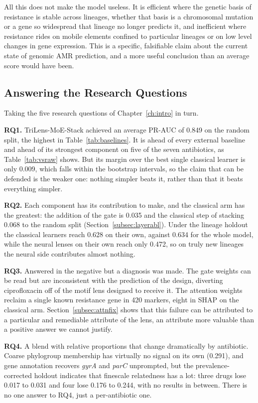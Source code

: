 All this does not make the model useless. It is efficient where the genetic basis of resistance
is stable across lineages, whether that basis is a chromosomal mutation or a gene so widespread
that lineage no longer predicts it, and inefficient where resistance rides on mobile elements
confined to particular lineages or on low level changes in gene expression. This is a specific,
falsifiable claim about the current state of genomic AMR prediction, and a more useful
conclusion than an average score would have been.

\subsection{Answering the Research Questions}

Taking the five research questions of Chapter~\ref{ch:intro} in turn.

\textbf{RQ1.} TriLens-MoE-Stack achieved an average PR-AUC of 0.849 on the random split, the
highest in Table~\ref{tab:baselines}. It is ahead of every external baseline and ahead of its
strongest component on five of the seven antibiotics, as Table~\ref{tab:vsraw} shows. But its
margin over the best single classical learner is only 0.009, which falls
within the bootstrap intervals, so the claim that can be defended is the weaker one: nothing
simpler beats it, rather than that it beats everything simpler.

\textbf{RQ2.} Each component has its contribution to make, and the classical arm has the greatest:
the addition of the gate is 0.035 and the classical step of stacking 0.068 to the random split
(Section~\ref{subsec:layerabl}). Under the lineage holdout the classical learners reach 0.628 on
their own, against 0.634 for the whole model, while the neural lenses on their own reach only
0.472, so on truly new lineages the neural side contributes almost nothing.

\textbf{RQ3.} Answered in the negative but a diagnosis was made. The gate weights can be read but
are inconsistent with the prediction of the design, diverting ciprofloxacin off of the motif lens
designed to receive it. The attention weights reclaim a single known resistance gene in 420
markers, eight in SHAP on the classical arm. Section~\ref{subsec:attnfix} shows that this failure
can be attributed to a particular and remediable attribute of the lens, an attribute more valuable
than a positive answer we cannot justify.

\textbf{RQ4.} A blend with relative proportions that change dramatically by antibiotic. Coarse
phylogroup membership has virtually no signal on its own (0.291), and gene annotation recovers
\textit{gyrA} and \textit{parC} unprompted, but the prevalence-corrected holdout indicates that
finescale relatedness has a lot: three drugs lose 0.017 to 0.031 and four lose 0.176 to 0.244, with
no results in between. There is no one answer to RQ4, just a per-antibiotic one.

